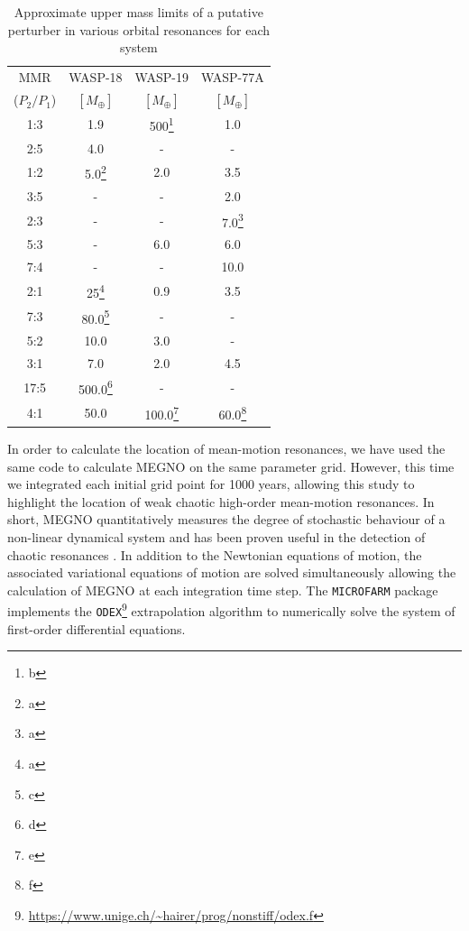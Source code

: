 \begin{table}
\caption{Approximate upper mass limits of a putative perturber in various orbital resonances for each system}
\label{masstable}
\centering
\begin{tabular}{cccc}
\hline \hline
MMR & WASP-18 & WASP-19 & WASP-77A \\
($P_{2}/P_{1}$) & $[M_{\oplus}]$ & $[M_{\oplus}]$ & $[M_{\oplus}]$ \\
\hline
1:3 & 1.9    & 500\footnote{b} & 1.0 \\
2:5 & 4.0    & -   & -   \\
1:2 & 5.0\footnote{a} & 2.0 & 3.5 \\
3:5 & -      & -      & 2.0 \\
2:3 & -      & -      & 7.0\footnote{a} \\
5:3 & -      & 6.0    & 6.0   \\
7:4 & -      & -      & 10.0 \\
2:1 & 25\footnote{a}    & 0.9    & 3.5 \\
7:3 & 80.0\footnote{c}   & -      & -   \\
5:2 & 10.0   & 3.0    & -   \\
3:1 & 7.0    & 2.0    & 4.5 \\
17:5 & 500.0\footnote{d} & -      & -    \\
4:1 & 50.0   & 100.0\footnote{e}  & 60.0\footnote{f} \\
\hline
\end{tabular}
\end{table} 

In order to calculate the location of mean-motion resonances, we have used the same code to calculate MEGNO on the same parameter grid. However, this time we integrated each initial grid point for 1000 years, allowing this study to highlight the location of weak chaotic high-order mean-motion resonances. In short, MEGNO quantitatively measures the degree of stochastic behaviour of a non-linear dynamical system and has been proven useful in the detection of chaotic resonances \citep{go2001, hi2010}. In addition to the Newtonian equations of motion, the associated variational equations of motion are solved simultaneously allowing the calculation of MEGNO at each integration time step. The \texttt{MICROFARM} package implements the \texttt{ODEX}\footnote{\url{https://www.unige.ch/~hairer/prog/nonstiff/odex.f}} extrapolation algorithm to numerically solve the system of first-order differential equations.

